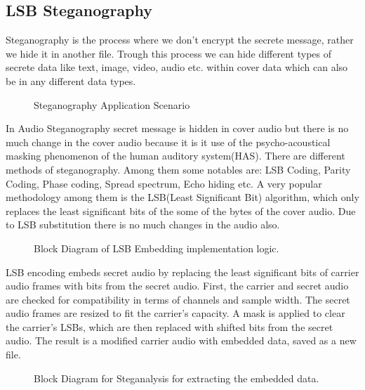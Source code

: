 \documentclass[a4paper]{cas-sc}
\begin{document}
\subsection{LSB Steganography}
\label{sec:steganography}
Steganography is the process where we don't encrypt the secrete message, rather we hide it in another file. Trough this process we can hide different types of secrete data like text, image, video, audio etc. within cover data which can also be in any different data types.\cite{jayaram2011information}\cite{hemeida2021comparative}
\begin{figure}[pos=H]
    \begin{center}
        
        \caption{Steganography Application Scenario}
        \label{fig:stegoApplication}
    \end{center}
\end{figure}

In Audio Steganography secret message is hidden in cover audio but there is no much change in the cover audio because it is it use of the psycho-acoustical masking phenomenon of the human auditory system(HAS). There are different methods of steganography. Among them some notables are: LSB Coding, Parity Coding, Phase coding, Spread spectrum, Echo hiding etc.\cite{hemeida2021comparative} A very popular methodology among them is the LSB(Least Significant Bit) algorithm, which only replaces the least significant bits of the some of the bytes of the cover audio. Due to LSB substitution there is no much changes in the audio also.
\begin{figure}[pos=h]
    \begin{center}
        
        \caption{Block Diagram of LSB Embedding implementation logic.}
        \label{fig:stegoEmbed}
    \end{center}
\end{figure}

LSB encoding embeds secret audio by replacing the least significant bits of carrier audio frames with bits from the secret audio. First, the carrier and secret audio are checked for compatibility in terms of channels and sample width. The secret audio frames are resized to fit the carrier's capacity. A mask is applied to clear the carrier's LSBs, which are then replaced with shifted bits from the secret audio. The result is a modified carrier audio with embedded data, saved as a new file.
\begin{figure}[pos=h]
    \begin{center}
        
        \caption{Block Diagram for Steganalysis for extracting the embedded data.}
        \label{fig:stegoExtract}
    \end{center}
\end{figure}
\end{document}
